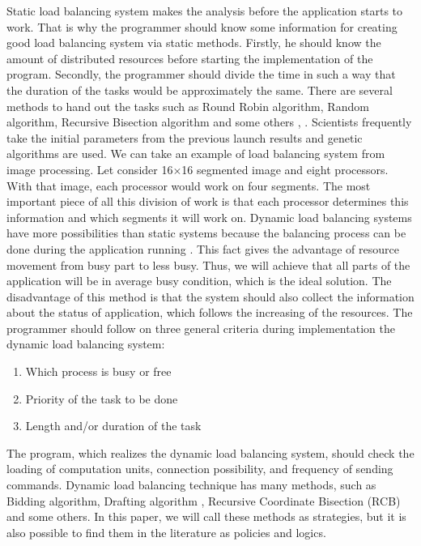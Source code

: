 Static load balancing system makes the analysis before the application starts to work. That is why the programmer should know some information for creating good load balancing system via static methods. Firstly, he should know the amount of distributed resources before starting the implementation of the program. Secondly, the programmer should divide the time in such a way that the duration of the tasks would be approximately the same. There are several methods to hand out the tasks such as Round Robin algorithm, Random algorithm, Recursive Bisection algorithm and some others \cite{oper_sys_conc}, \cite{perf_dlba}. Scientists frequently take the initial parameters from the previous launch results and genetic algorithms are used. We can take an example of load balancing system from image processing. Let consider 16$\times$16 segmented image and eight processors. With that image, each processor would work on four segments. The most important piece of all this division of work is that each processor determines this information and which segments it will work on.
\newpage
Dynamic load balancing systems have more possibilities than static systems because the balancing process can be done during the application running \cite{guide_dyn_bal}. This fact gives the advantage of resource movement from busy part to less busy. Thus, we will achieve that all parts of the application will be in average busy condition, which is the ideal solution. The disadvantage of this method is that the system should also collect the information about the status of application, which follows the increasing of the resources. The programmer should follow on three general criteria during implementation the dynamic load balancing system:
\begin{enumerate}%
	\setlength{\itemsep}{-2mm}
	\item Which process is busy or free 
	\item Priority of the task to be done 
	\item Length and/or duration of the task
\end{enumerate}
The program, which realizes the dynamic load balancing system, should check the loading of computation units, connection possibility, and frequency of sending commands. Dynamic load balancing technique has many methods, such as Bidding algorithm, Drafting algorithm \cite{draft_alg}, Recursive Coordinate Bisection (RCB) and some others. In this paper, we will call these methods as strategies, but it is also possible to find them in the literature as policies and logics.

